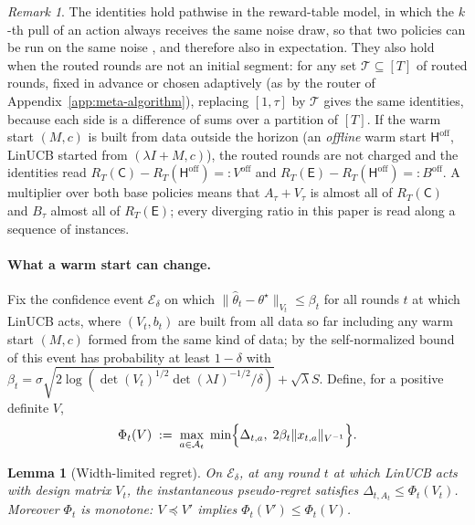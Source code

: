 \documentclass{article}
\newtheorem{lemma}{Lemma}
\theoremstyle{definition}
\theoremstyle{remark}
\newtheorem{remark}{Remark}
\theoremstyle{remark}
\newcommand{\Cold}{\mathsf{C}}
\newcommand{\Exp}{\mathsf{E}}
\newcommand{\Hyb}{\mathsf{H}}
\begin{document}
\begin{remark}
\label{rem:decomp}
The identities hold pathwise in the reward-table model, in which the $k$-th
pull of an action always receives the same noise draw, so that two policies
can be run on the same noise \cite[\S4.6]{lattimore2020bandit}, and
therefore also in expectation. They also hold when the routed rounds are not
an initial segment: for any set $\mathcal T\subseteq[T]$ of routed rounds,
fixed in advance or chosen adaptively (as by the router of
Appendix~\ref{app:meta-algorithm}), replacing $[1,\tau]$ by $\mathcal T$
gives the same identities, because each side is a difference of sums over a
partition of $[T]$. If the warm start $(M,c)$ is built from data outside the
horizon (an \emph{offline} warm start $\Hyb^{\mathrm{off}}$, LinUCB started
from $(\lambda I+M,c)$), the routed rounds are not charged and the identities
read $R_T(\Cold)-R_T(\Hyb^{\mathrm{off}})=:V^{\mathrm{off}}$ and
$R_T(\Exp)-R_T(\Hyb^{\mathrm{off}})=:B^{\mathrm{off}}$. A multiplier over both
base policies means that $A_\tau+V_\tau$ is almost all of $R_T(\Cold)$ and
$B_\tau$ almost all of $R_T(\Exp)$; every diverging ratio in this paper is
read along a sequence of instances.
\end{remark}

\paragraph{What a warm start can change.}
\label{sec:width}
Fix the confidence event $\mathcal E_\delta$ on which
$\|\widehat\theta_t-\theta^\star\|_{V_t}\le\beta_t$ for all rounds $t$ at
which LinUCB acts, where $(V_t,b_t)$ are built from all data so far including
any warm start $(M,c)$ formed from the same kind of data; by the
self-normalized bound of \cite{abbasi2011improved} this event has probability
at least $1-\delta$ with
$\beta_t=\sigma\sqrt{2\log(\det(V_t)^{1/2}\det(\lambda I)^{-1/2}/\delta)}+\sqrt\lambda S$.
Define, for a positive definite $V$,
\begin{equation}
\label{eq:phi}
\Phi_t(V)\;:=\;\max_{a\in\mathcal A_t}\;\min\Bigl\{\Delta_{t,a},\;2\beta_t\|x_{t,a}\|_{V^{-1}}\Bigr\}.
\end{equation}

\begin{lemma}[Width-limited regret]
\label{lem:width-limited}
On $\mathcal E_\delta$, at any round $t$ at which LinUCB acts with design
matrix $V_t$, the instantaneous pseudo-regret satisfies
$\Delta_{t,A_t}\le\Phi_t(V_t)$. Moreover $\Phi_t$ is monotone: $V\preceq V'$
implies $\Phi_t(V')\le\Phi_t(V)$.
\end{lemma}
\end{document}

